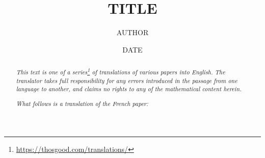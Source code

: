 \documentclass{article}
\title{TITLE}
\author{AUTHOR}
\date{DATE}
\begin{document}
\maketitle
\thispagestyle{fancy}

\renewcommand{\abstractname}{Translator's note.}

\begin{abstract}
  \renewcommand*{\thefootnote}{\fnsymbol{footnote}}
  \emph{This text is one of a series\footnote{\url{https://thosgood.com/translations/}} of translations of various papers into English.}
  \emph{The translator takes full responsibility for any errors introduced in the passage from one language to another, and claims no rights to any of the mathematical content herein.}
  
  \emph{What follows is a translation of the French paper:}

  \medskip\noindent
\end{abstract}

\setcounter{footnote}{0}

\tableofcontents
\bigskip






\nocite{*}

\end{document}
